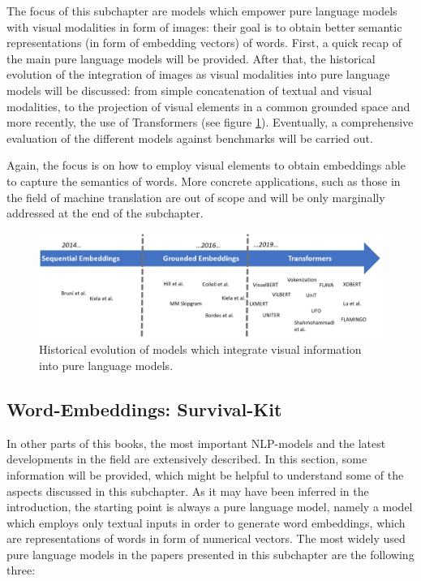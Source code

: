 \documentclass[
]{krantz}
\begin{document}
The focus of this subchapter are models which empower pure language models with visual modalities in form of images: their goal is to obtain better semantic representations (in form of embedding vectors) of words. First, a quick recap of the main pure language models will be provided. After that, the historical evolution of the integration of images as visual modalities into pure language models will be discussed: from simple concatenation of textual and visual modalities, to the projection of visual elements in a common grounded space and more recently, the use of Transformers (see figure \ref{fig:img-hist}). Eventually, a comprehensive evaluation of the different models against benchmarks will be carried out.

Again, the focus is on how to employ visual elements to obtain embeddings able to capture the semantics of words. More concrete applications, such as those in the field of machine translation are out of scope and will be only marginally addressed at the end of the subchapter.

\begin{figure}

{\centering \includegraphics[width=1\linewidth]{figures/02-03-img-support-text/Img-Hist} 

}

\caption{Historical evolution of models which integrate visual information into pure language models. }\label{fig:img-hist}
\end{figure}

\hypertarget{word-embeddings-survival-kit}{%
\subsection{Word-Embeddings: Survival-Kit}\label{word-embeddings-survival-kit}}

In other parts of this books, the most important NLP-models and the latest developments in the field are extensively described. In this section, some information will be provided, which might be helpful to understand some of the aspects discussed in this subchapter. As it may have been inferred in the introduction, the starting point is always a pure language model, namely a model which employs only textual inputs in order to generate word embeddings, which are representations of words in form of numerical vectors.
The most widely used pure language models in the papers presented in this subchapter are the following three:
\end{document}
